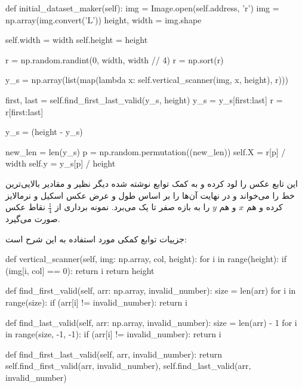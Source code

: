 \documentclass[12pt,titlepage,a4page , tikz , multi,table , svgnames,xcdraw]{article}
\begin{document}
\begin{latin}
\begin{python}[language=Python]


    def initial_dataset_maker(self):
        img = Image.open(self.address, 'r')
        img = np.array(img.convert('L'))
        height, width = img.shape

        self.width = width
        self.height = height

        r = np.random.randint(0, width, width // 4)
        r = np.sort(r)

        y_s = np.array(list(map(lambda x:
         self.vertical_scanner(img, x, height), r)))

        first, last = self.find_first_last_valid(y_s, height)
        y_s = y_s[first:last]
        r = r[first:last]

        y_s = (height - y_s)

        new_len = len(y_s)
        p = np.random.permutation((new_len))
        self.X = r[p] / width
        self.y = y_s[p] / height
\end{python}

\end{latin}

این تابع عکس را لود کرده و به کمک توابع نوشته شده دیگر نظیر  و  مقادیر بالایی‌ترین خط را می‌خواند و در نهایت آن‌ها را بر اساس طول و عرض عکس اسکیل و نرمالایز کرده و هم $x$ و هم $y$ را به بازه صفر تا یک می‌برد. نمونه برداری از $\frac{1}{4}$
نقاط عکس صورت می‌گیرد.


جزییات توابع کمکی مورد استفاده به این شرح است:


\begin{latin}
\begin{python}[language=Python]



   def vertical_scanner(self, img: np.array, col, height):
        for i in range(height):
            if (img[i, col] == 0):
                return i
        return height

    def find_first_valid(self, arr: np.array, invalid_number):
        size = len(arr)
        for i in range(size):
            if (arr[i] != invalid_number):
                return i

    def find_last_valid(self, arr: np.array, invalid_number):
        size = len(arr) - 1
        for i in range(size, -1, -1):
            if (arr[i] != invalid_number):
                return i

    def find_first_last_valid(self, arr, invalid_number):
        return self.find_first_valid(arr, invalid_number),
         self.find_last_valid(arr, invalid_number)

\end{python}

\end{latin}
\end{document}
